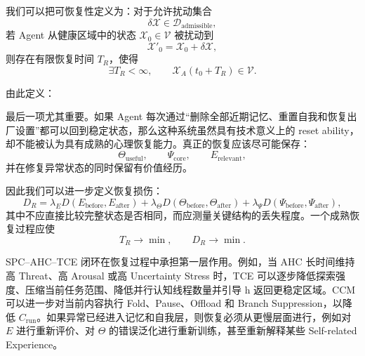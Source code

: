 我们可以把可恢复性定义为：对于允许扰动集合
\begin{equation}
\delta\mathcal{X}
\in
\mathcal{D}_{\mathrm{admissible}},
\end{equation}
若 Agent 从健康区域中的状态 $\mathcal{X}_0\in\mathcal{V}$ 被扰动到
\begin{equation}
\mathcal{X}'_0
=
\mathcal{X}_0+\delta\mathcal{X},
\end{equation}
则存在有限恢复时间 $T_R$，使得
\begin{equation}
\exists T_R<\infty,
\qquad
\mathcal{X}_A(t_0+T_R)\in\mathcal{V}.
\end{equation}

由此定义：
\begin{statementbox}
\centering
{}
\end{statementbox}

最后一项尤其重要。如果 Agent 每次通过“删除全部近期记忆、重置自我和恢复出厂设置”都可以回到稳定状态，那么这种系统虽然具有技术意义上的 reset ability，却不能被认为具有成熟的心理恢复能力。真正的恢复应该尽可能保存：
\begin{equation}
\Theta_{\mathrm{useful}},
\qquad
\Psi_{\mathrm{core}},
\qquad
E_{\mathrm{relevant}},
\end{equation}
并在修复异常状态的同时保留有价值经历。

因此我们可以进一步定义恢复损伤：
\begin{equation}
D_R
=
\lambda_E D(E_{\mathrm{before}},E_{\mathrm{after}})
+
\lambda_\Theta D(\Theta_{\mathrm{before}},\Theta_{\mathrm{after}})
+
\lambda_\Psi D(\Psi_{\mathrm{before}},\Psi_{\mathrm{after}}),
\end{equation}
其中不应直接比较完整状态是否相同，而应测量关键结构的丢失程度。一个成熟恢复过程应使
\begin{equation}
T_R
\rightarrow
\min,
\qquad
D_R
\rightarrow
\min.
\end{equation}

SPC--AHC--TCE 闭环在恢复过程中承担第一层作用。例如，当 AHC 长时间维持高 Threat、高 Arousal 或高 Uncertainty Stress 时，TCE 可以逐步降低探索强度、压缩当前任务范围、降低并行认知线程数量并引导 h 返回更稳定区域。CCM 可以进一步对当前内容执行 Fold、Pause、Offload 和 Branch Suppression，以降低 $C_{\mathrm{run}}$。如果异常已经进入记忆和自我层，则恢复必须从更慢层面进行，例如对 $E$ 进行重新评价、对 $\Theta$ 的错误泛化进行重新训练，甚至重新解释某些 Self-related Experience。

